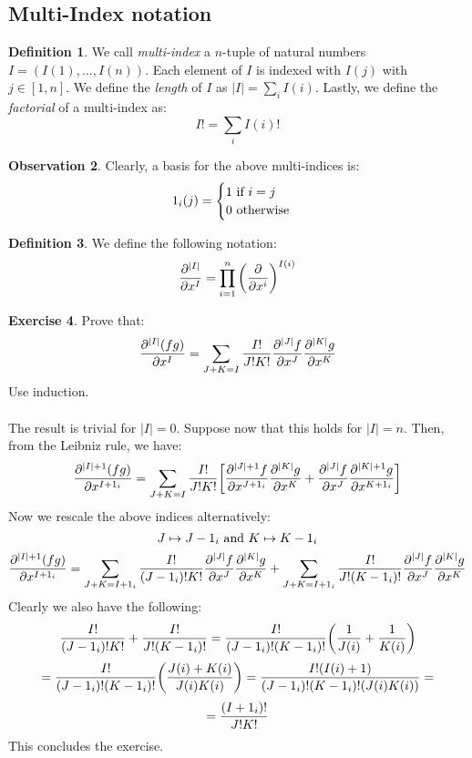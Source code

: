 \documentclass[12pt,a4paper]{report}
\theoremstyle{definition}
\newtheorem{Def}{Definition}[chapter]
\theoremstyle{Theorem}
\theoremstyle{definition}
\newtheorem{Exe}[Def]{Exercise}
\theoremstyle{definition}
\newtheorem{Obs}[Def]{Observation}
\begin{document}
	\subsection{Multi-Index notation}
	\begin{Def}
		We call \textit{multi-index} a $n$-tuple of natural numbers $I=(I(1),...,I(n))$. Each element of $I$ is indexed with $I(j)$ with $j\in [1,n]$. We define the \textit{length} of $I$ as $|I|=\sum_i I(i)$. Lastly, we define the \textit{factorial} of a multi-index as:
		$$I!=\sum_{i}I(i)!$$
	\end{Def}
	\begin{Obs}
		Clearly, a basis for the above multi-indices is:
		$$1_i(j)=\begin{cases}
			1 \hbox{ if } i=j\\
			0 \hbox{ otherwise}
		\end{cases}$$
	\end{Obs}
	\begin{Def}
		We define the following notation:
		$${\partial^{|I|}\over \partial x^I}=\prod_{i=1}^n\bigg({\partial \over \partial x^i}\bigg)^{I(i)}$$
	\end{Def}
	\begin{Exe}
		Prove that:
		$${\partial^{|I|}(fg)\over \partial x^I}=\sum_{J+K=I} {I!\over J!K!}{\partial^{|J|}f\over \partial x^J}{\partial^{|K|}g\over \partial x^K}$$
		Use induction.\\
		\\
		The result is trivial for $|I|=0$. Suppose now that this holds for $|I|=n$. Then, from the Leibniz rule, we have:
		$${\partial^{|I|+1}(fg)\over \partial x^{I+1_i}}=\sum_{J+K=I} {I!\over J!K!}\bigg[{\partial^{|J|+1}f\over \partial x^{J+1_i}}{\partial^{|K|}g\over \partial x^{K}}+{\partial^{|J|}f\over \partial x^{J}}{\partial^{|K|+1}g\over \partial x^{K+1_i}}\bigg]$$
		Now we rescale the above indices alternatively: 
		$$J\mapsto J-1_i\hbox{ and }K\mapsto K-1_i$$
		$${\partial^{|I|+1}(fg)\over \partial x^{I+1_i}}=\sum_{J+K=I+1_i} {I!\over (J-1_i)!K!}{\partial^{|J|}f\over \partial x^{J}}{\partial^{|K|}g\over \partial x^{K}}+\sum_{J+K=I+1_i}{I!\over J!(K-1_i)!}{\partial^{|J|}f\over \partial x^{J}}{\partial^{|K|}g\over \partial x^{K}}$$
		Clearly we also have the following:
		$${I!\over (J-1_i)!K!}+{I!\over J!(K-1_i)!}={I!\over (J-1_i)!(K-1_i)!}\bigg({1\over J(i)}+{1\over K(i)}\bigg)$$
		$$={I!\over (J-1_i)!(K-1_i)!}\bigg({J(i)+K(i)\over J(i)K(i)}\bigg)={I!(I(i)+1)\over (J-1_i)!(K-1_i)!(J(i)K(i))}=$$
		$$={(I+1_i)!\over J!K!}$$
		This concludes the exercise.
	\end{Exe}
\end{document}
